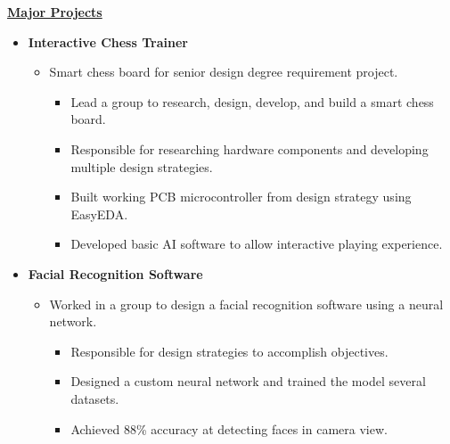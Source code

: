 \documentclass[11pt]{article}
\begin{document}

   \vspace{0.5cm}
   \noindent\underline{\textbf{Major Projects}}

   \begin{minipage}{0.95\textwidth}
      \vspace{0.25cm}
      \begin{itemize}
         \item \textbf{Interactive Chess Trainer}
            \vspace{-0.4cm}

            \begin{itemize}
               \item Smart chess board for senior design degree requirement project.
               \vspace{-0.1cm}

               \begin{itemize}\setlength\itemsep{-0.05cm}
                  \item Lead a group to research, design, develop, and build a smart chess board. 
                  \item Responsible for researching hardware components and developing multiple design strategies.
                  \item Built working PCB microcontroller from design strategy using EasyEDA.
                  \item Developed basic AI software to allow interactive playing experience.
               \end{itemize}

            \end{itemize}

         \item \textbf{Facial Recognition Software}
            \vspace{-0.4cm}

            \begin{itemize}\setlength\itemsep{-0.5cm}
               \item Worked in a group to design a facial recognition software using a neural network.
               \vspace{-0.1cm}

               \begin{itemize}\setlength\itemsep{-0.05cm}
                  \item Responsible for design strategies to accomplish objectives.
                  \item Designed a custom neural network and trained the model several datasets.
                  \item Achieved 88\% accuracy at detecting faces in camera view.
               \end{itemize}


\end{itemize}
\end{itemize}
\end{minipage}
\end{document}
